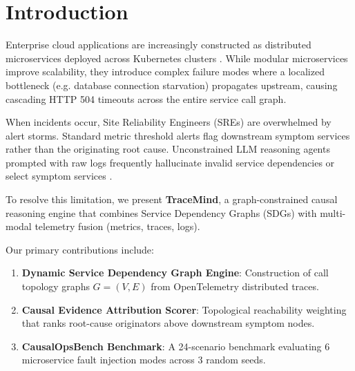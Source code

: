 \section{Introduction}
\label{sec:intro}

Enterprise cloud applications are increasingly constructed as distributed microservices deployed across Kubernetes clusters \cite{wu2020microrca}. While modular microservices improve scalability, they introduce complex failure modes where a localized bottleneck (e.g. database connection starvation) propagates upstream, causing cascading HTTP 504 timeouts across the entire service call graph.

When incidents occur, Site Reliability Engineers (SREs) are overwhelmed by alert storms. Standard metric threshold alerts flag downstream symptom services rather than the originating root cause. Unconstrained LLM reasoning agents prompted with raw logs frequently hallucinate invalid service dependencies or select symptom services \cite{meng2020cloudrca}.

To resolve this limitation, we present \textbf{TraceMind}, a graph-constrained causal reasoning engine that combines Service Dependency Graphs (SDGs) with multi-modal telemetry fusion (metrics, traces, logs).

Our primary contributions include:
\begin{enumerate}
    \item \textbf{Dynamic Service Dependency Graph Engine}: Construction of call topology graphs $G=(V, E)$ from OpenTelemetry distributed traces.
    \item \textbf{Causal Evidence Attribution Scorer}: Topological reachability weighting that ranks root-cause originators above downstream symptom nodes.
    \item \textbf{CausalOpsBench Benchmark}: A 24-scenario benchmark evaluating 6 microservice fault injection modes across 3 random seeds.
\end{enumerate}
